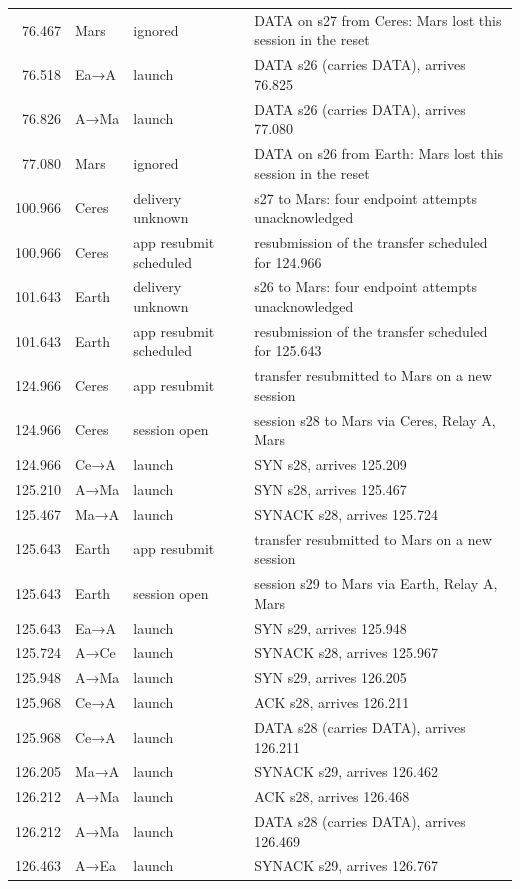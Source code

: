 \documentclass[10pt,letterpaper]{article}
\begin{document}
{\begin{longtable}{@{}rll>{\raggedright\arraybackslash}p{8.2cm}@{}}
76.467 & Mars & ignored & DATA on s27 from Ceres: Mars lost this session in the reset \\
76.518 & Ea→A & launch & DATA s26 (carries DATA), arrives 76.825 \\
76.826 & A→Ma & launch & DATA s26 (carries DATA), arrives 77.080 \\
77.080 & Mars & ignored & DATA on s26 from Earth: Mars lost this session in the reset \\
100.966 & Ceres & delivery unknown & s27 to Mars: four endpoint attempts unacknowledged \\
100.966 & Ceres & app resubmit scheduled & resubmission of the transfer scheduled for 124.966 \\
101.643 & Earth & delivery unknown & s26 to Mars: four endpoint attempts unacknowledged \\
101.643 & Earth & app resubmit scheduled & resubmission of the transfer scheduled for 125.643 \\
124.966 & Ceres & app resubmit & transfer resubmitted to Mars on a new session \\
124.966 & Ceres & session open & session s28 to Mars via Ceres, Relay A, Mars \\
124.966 & Ce→A & launch & SYN s28, arrives 125.209 \\
125.210 & A→Ma & launch & SYN s28, arrives 125.467 \\
125.467 & Ma→A & launch & SYNACK s28, arrives 125.724 \\
125.643 & Earth & app resubmit & transfer resubmitted to Mars on a new session \\
125.643 & Earth & session open & session s29 to Mars via Earth, Relay A, Mars \\
125.643 & Ea→A & launch & SYN s29, arrives 125.948 \\
125.724 & A→Ce & launch & SYNACK s28, arrives 125.967 \\
125.948 & A→Ma & launch & SYN s29, arrives 126.205 \\
125.968 & Ce→A & launch & ACK s28, arrives 126.211 \\
125.968 & Ce→A & launch & DATA s28 (carries DATA), arrives 126.211 \\
126.205 & Ma→A & launch & SYNACK s29, arrives 126.462 \\
126.212 & A→Ma & launch & ACK s28, arrives 126.468 \\
126.212 & A→Ma & launch & DATA s28 (carries DATA), arrives 126.469 \\
126.463 & A→Ea & launch & SYNACK s29, arrives 126.767 \\

\end{longtable}}
\end{document}
